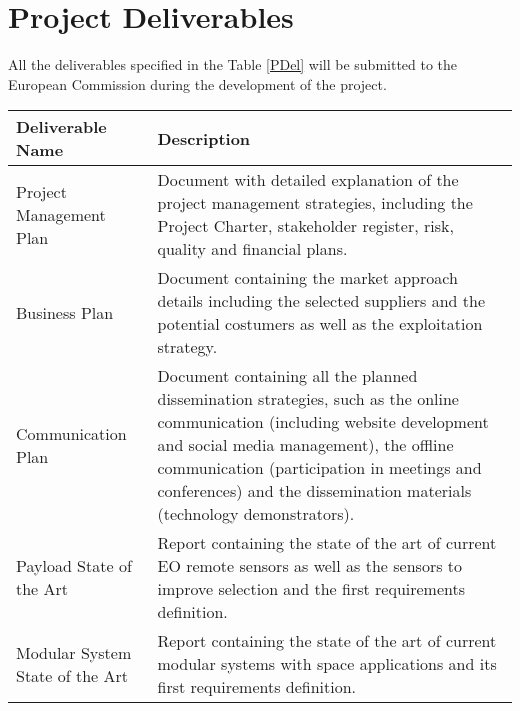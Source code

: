 \section{Project Deliverables}

All the deliverables specified in the Table \ref{PDel} will be submitted to the European Commission during the development of the project. 

\begin{longtable}[H]{>{\raggedright\arraybackslash}p{4cm} p{10cm}}
	
	\toprule[2pt]
	
	\textbf{Deliverable Name} & \textbf{Description} \\
	
	\midrule[1.5pt] 
	\endhead
	
	Project Management Plan & Document with detailed explanation of the project management strategies, including the Project Charter, stakeholder register, risk, quality and financial plans.\vspace{0.2cm} \\
	
	\midrule

	Business Plan & Document containing the market approach details including the selected suppliers and the potential costumers as well as the exploitation strategy.\vspace{0.2cm} \\
	
	\midrule
	
	Communication Plan  & Document containing all the planned dissemination strategies, such as the online communication (including website development and social media management), the offline communication (participation in meetings and conferences) and the dissemination materials (technology demonstrators).\vspace{0.2cm} \\
	
	\midrule

	Payload State of the Art  & Report containing the state of the art of current EO remote sensors as well as the sensors to improve selection and the first requirements definition.\vspace{0.2cm} \\
	
	\midrule

	Modular System State of the Art  & Report containing the state of the art of current modular systems with space applications and its first requirements definition.\vspace{0.2cm} \\
	

\end{longtable}
